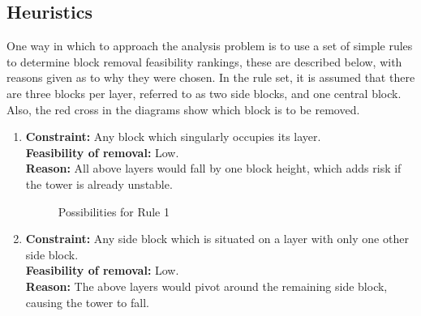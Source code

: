 \subsection{Heuristics}\label{subsec:heuristics}

One way in which to approach the analysis problem is to use a set of simple rules to determine block removal feasibility rankings, these are described below, with reasons given as to why they were chosen. In the rule set, it is assumed that there are three blocks per layer, referred to as two side blocks, and one central block. Also, the red cross in the diagrams show which block is to be removed.

\begin{enumerate}
    
	\item \textbf{Constraint:} Any block which singularly occupies its layer.
	\\\textbf{Feasibility of removal:} Low.
	\\\textbf{Reason:} All above layers would fall by one block height, which adds risk if the tower is already unstable.
	
	 \begin{figure}[ht]
        \centering
        \begin{minipage}{.3\textwidth}
            \centering
        \end{minipage}\hfill
        \begin{minipage}{.3\textwidth}
            \centering
        \end{minipage}\hfill
        \begin{minipage}{.3\textwidth}
            \centering
        \end{minipage}
        \caption{Possibilities for Rule 1}
    \end{figure}
	
	\item \textbf{Constraint:} Any side block which is situated on a layer with only one other side block.
	\\\textbf{Feasibility of removal:} Low.
	\\\textbf{Reason:} The above layers would pivot around the remaining side block, causing the tower to fall.
	

\end{enumerate}
